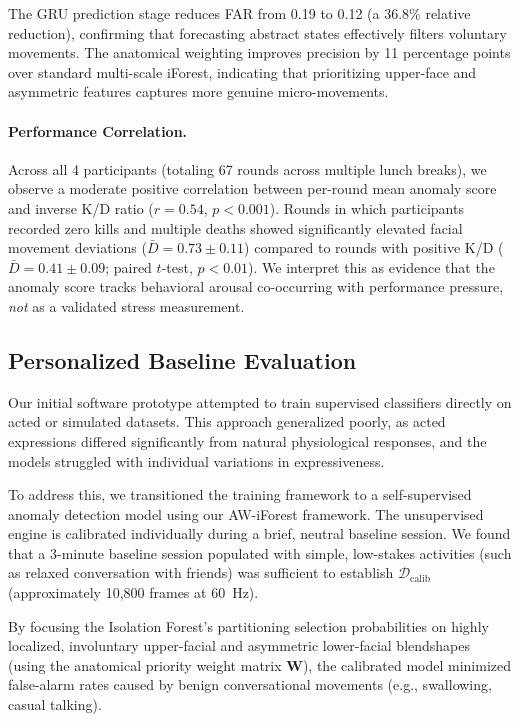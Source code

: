 \documentclass[sigconf]{acmart}
\begin{document}
The GRU prediction stage reduces FAR from 0.19 to 0.12 (a 36.8\% relative reduction), confirming that forecasting abstract states effectively filters voluntary movements. The anatomical weighting improves precision by 11 percentage points over standard multi-scale iForest, indicating that prioritizing upper-face and asymmetric features captures more genuine micro-movements.

\paragraph{Performance Correlation.}
Across all 4 participants (totaling 67 rounds across multiple lunch breaks), we observe a moderate positive correlation between per-round mean anomaly score and inverse K/D ratio ($r = 0.54$, $p < 0.001$). Rounds in which participants recorded zero kills and multiple deaths showed significantly elevated facial movement deviations ($\bar{D} = 0.73 \pm 0.11$) compared to rounds with positive K/D ($\bar{D} = 0.41 \pm 0.09$; paired $t$-test, $p < 0.01$). We interpret this as evidence that the anomaly score tracks behavioral arousal co-occurring with performance pressure, \emph{not} as a validated stress measurement. 

\subsection{Personalized Baseline Evaluation}
Our initial software prototype attempted to train supervised classifiers directly on acted or simulated datasets. This approach generalized poorly, as acted expressions differed significantly from natural physiological responses, and the models struggled with individual variations in expressiveness.

To address this, we transitioned the training framework to a self-supervised anomaly detection model using our AW-iForest framework. The unsupervised engine is calibrated individually during a brief, neutral baseline session. We found that a 3-minute baseline session populated with simple, low-stakes activities (such as relaxed conversation with friends) was sufficient to establish $\mathcal{D}_{\text{calib}}$ (approximately 10,800 frames at 60~Hz). 

By focusing the Isolation Forest's partitioning selection probabilities on highly localized, involuntary upper-facial and asymmetric lower-facial blendshapes (using the anatomical priority weight matrix $\mathbf{W}$), the calibrated model minimized false-alarm rates caused by benign conversational movements (e.g., swallowing, casual talking). 
\end{document}
